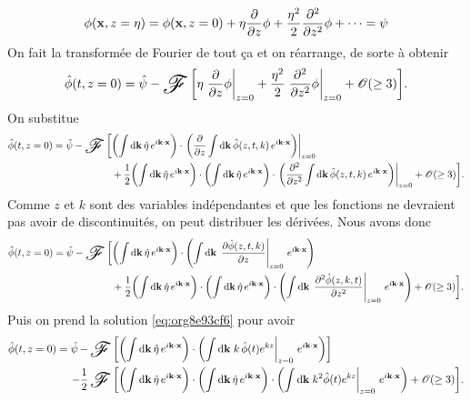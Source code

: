 \documentclass[10pt]{article}
\numberwithin{equation}{section}
\newcommand{\xx}{\vb{x}}
\newcommand{\fourier}{\operatorname{\raisebox{-0.4em}{\resizebox{2em}{!}{$\mathscr{F}$}}}}
\begin{document}
\begin{equation}
   \phi(\xx,z = \eta) = \phi(\xx,z=0) + \eta \pdv{}{z}\phi + \frac{\eta^2}{2}\pdv[2]{}{z}\phi + \cdots = \psi
\end{equation}
On fait la transformée de Fourier de tout ça et on réarrange, de sorte à obtenir
\begin{equation}
   \hat{\phi}(t,z=0) = \hat{\psi} - \fourier \qty[\eta \eval{\pdv{}{z}\phi}_{z=0} + \frac{\eta^2}{2}\eval{\pdv[2]{}{z}\phi}_{z=0} + \mathscr{O}(\geq3)].
\end{equation}
On substitue
\begin{align}
   \hat{\phi}(t,z=0) = \hat{\psi} - \fourier\bigg[&\qty(\int \dd\vb{k}\, \hat{\eta}\, e^{i\vb{k}\cdot\xx}) \cdot\eval{\qty(\pdv{}{z}\int\dd\vb{k}\,\hat{\phi}(z,t,k)\,e^{i\vb{k}\cdot\xx})}_ {z=0}\nonumber\\
   &+\frac{1}{2}\qty(\int \dd\vb{k}\, \hat{\eta}\, e^{i\vb{k}\cdot\xx})\cdot\qty(\int \dd\vb{k}\, \hat{\eta}\, e^{i\vb{k}\cdot\xx})\cdot \eval{\qty(\pdv[2]{}{z}\int\dd\vb{k}\,\hat{\phi}(z,t,k)\,e^{i\vb{k}\cdot\xx})}_{z=0}
   +\mathscr{O}(\geq3)\bigg].
\end{align}
Comme \(z\) et \(k\) sont des variables indépendantes et que les fonctions ne devraient pas avoir de discontinuités, on peut distribuer les dérivées.
Nous avons donc
\begin{align}
   \hat{\phi}(t,z=0) = \hat{\psi} - \fourier\bigg[&\qty(\int \dd\vb{k}\, \hat{\eta}\, e^{i\vb{k}\cdot\xx}) \cdot\qty(\int\dd\vb{k}\,\eval{\pdv{\hat{\phi}(z,t,k)}{z}}_{z=0}\,e^{i\vb{k}\cdot\xx})\nonumber\\
   &+\frac{1}{2}\qty(\int \dd\vb{k}\, \hat{\eta}\, e^{i\vb{k}\cdot\xx})\cdot\qty(\int \dd\vb{k}\, \hat{\eta}\, e^{i\vb{k}\cdot\xx})\cdot \qty(\int\dd\vb{k}\,\eval{\pdv[2]{\hat{\phi}(z,k,t)}{z}}_{z=0}\,e^{i\vb{k}\cdot\xx})
   +\mathscr{O}(\geq3)\bigg].
\end{align}
Puis on prend la solution \ref{eq:org8e93cf6} pour avoir
\begin{align}
   \hat{\phi}(t,z=0) = \hat{\psi}\, -& \fourier\bigg[\qty(\int \dd\vb{k}\, \hat{\eta}\, e^{i\vb{k}\cdot\xx}) \cdot\qty(\int\dd\vb{k}\eval{k\,\hat{\phi}(t)e^{kz}}_{z=0}\,e^{i\vb{k}\cdot\xx})\bigg]\nonumber\\
   -\frac{1}{2}&\fourier \bigg[\qty(\int \dd\vb{k}\, \hat{\eta}\, e^{i\vb{k}\cdot\xx})\cdot\qty(\int \dd\vb{k}\, \hat{\eta}\, e^{i\vb{k}\cdot\xx})\cdot \qty(\int\dd\vb{k}\eval{k^2 \hat{\phi}(t)e^{kz}}_{z=0}\,e^{i\vb{k}\cdot\xx})
   +\mathscr{O}(\geq3)\bigg].
\end{align}
\end{document}
